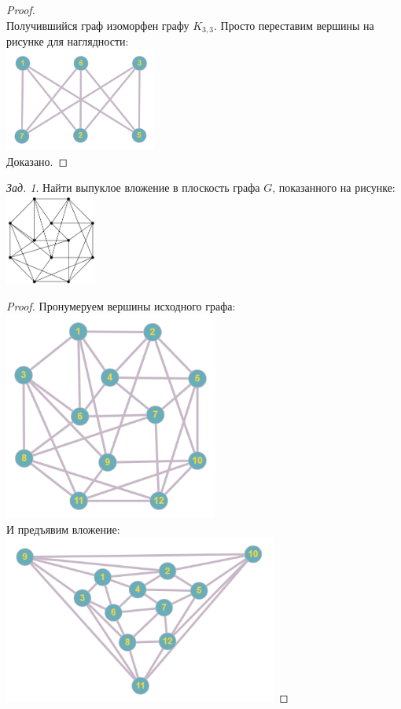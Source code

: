 \documentclass[a4paper,12pt]{article}
\theoremstyle{remark}
\newtheorem{problem}{Зад.}[section]
\begin{document}
\begin{proof}
	\\ Получившийся граф изоморфен графу $K_{3,3}$. Просто переставим вершины на рисунке для наглядности:
	\\ \includegraphics[width=5cm]{kuratovsky-task2-stage4.png}
	\\ Доказано.
\end{proof}


\begin{problem}
	Найти выпуклое вложение в плоскость графа $G$, показанного на рисунке:
	\\ \includegraphics[width=3cm]{kuratovsky-task3-stage0.png}
\end{problem}
\begin{proof}
	Пронумеруем вершины исходного графа:
	\\ \includegraphics[width=7cm]{kuratovsky-task3-stage1.png}
	\\ И предъявим вложение:
	\\ \includegraphics[width=9cm]{kuratovsky-task3-stage2.png}
\end{proof}
\end{document}
